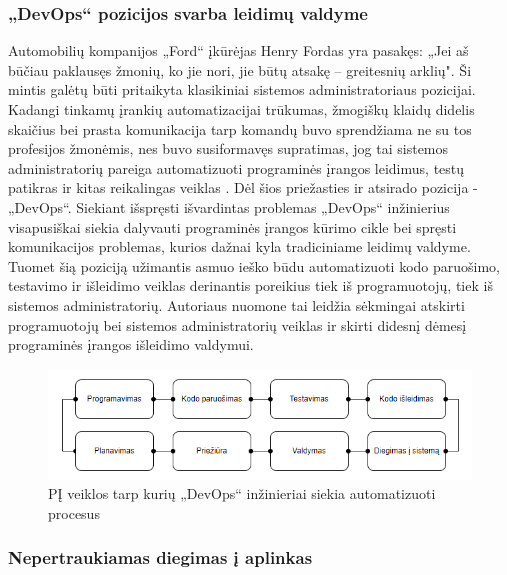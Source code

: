 \documentclass{VUMIFPSkursinis}
\begin{document}
    \subsubsection{„DevOps“ pozicijos svarba leidimų valdyme}

Automobilių kompanijos „Ford“ įkūrėjas Henry Fordas yra pasakęs: „Jei aš būčiau paklausęs žmonių, ko jie nori, jie būtų atsakę – greitesnių arklių". Ši mintis galėtų būti pritaikyta klasikiniai sistemos administratoriaus pozicijai. Kadangi tinkamų įrankių automatizacijai trūkumas, žmogiškų klaidų didelis skaičius bei prasta komunikacija tarp komandų buvo sprendžiama ne su tos profesijos žmonėmis, nes buvo susiformavęs supratimas, jog tai sistemos administratorių pareiga automatizuoti programinės įrangos leidimus, testų patikras ir kitas reikalingas veiklas \cite{SaltTrecias}. Dėl šios priežasties ir atsirado pozicija - „DevOps“. Siekiant išspręsti išvardintas problemas „DevOps“ inžinierius visapusiškai siekia dalyvauti programinės įrangos kūrimo cikle bei spręsti komunikacijos problemas, kurios dažnai kyla tradiciniame leidimų valdyme. Tuomet šią poziciją užimantis asmuo ieško būdu automatizuoti kodo paruošimo, testavimo ir išleidimo veiklas derinantis poreikius tiek iš programuotojų, tiek iš sistemos administratorių. Autoriaus nuomone tai leidžia sėkmingai atskirti programuotojų bei sistemos administratorių veiklas ir skirti didesnį dėmesį programinės įrangos išleidimo valdymui.

\begin{figure}[H]
    \centering
    \includegraphics[scale=0.8]{img/DevOps.png}
    \caption{PĮ veiklos tarp kurių „DevOps“ inžinieriai siekia automatizuoti procesus}
    \label{img:mlp}
\end{figure}

    \subsubsection{Nepertraukiamas diegimas į aplinkas}
    
\end{document}
